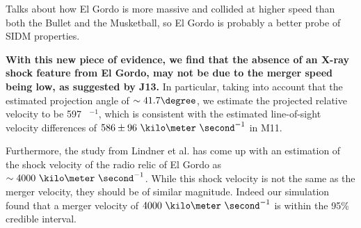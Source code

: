 
Talks about how El Gordo is more massive and collided at higher speed than
both the Bullet and the Musketball, so El Gordo is probably a better probe of SIDM properties.
%
%

\textbf{With this new piece of evidence, we find that the absence of an
X-ray shock feature from El Gordo, may not be due to the merger speed being
low, as suggested by J13.} 
In particular, taking into account that the estimated projection angle of 
$\sim 41.7\degree$, we estimate the projected relative velocity to be 597 \kilo \meter~\second$^{-1}$, which is consistent with the estimated line-of-sight velocity differences of $586 \pm  96~\kilo \meter ~\second^{-1}$ in M11. 

Furthermore, the study from \cite{L13} Lindner et al. has come up
with an estimation of the shock velocity of the radio relic of El Gordo as 
$\sim 4000~\kilo \meter~\second^{-1}$. While this shock velocity is not the
same as the merger velocity, they should be of similar magnitude. Indeed
our simulation found that a merger velocity of $4000~\kilo
\meter~\second^{-1}$ is within the 95\% credible interval. 
